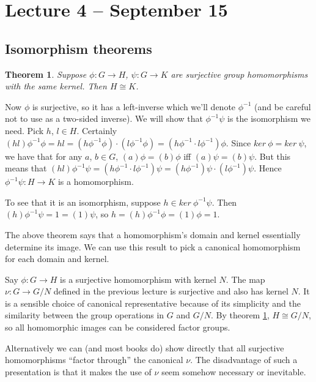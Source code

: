 \documentclass[letterpaper]{article}
\newtheorem{theorem}{Theorem}[section]
\newcommand{\mdot}{{\cdot}}
\newenvironment{proof}[1][Proof]{\begin{trivlist}
\item[\hskip \labelsep {\bfseries #1}]}{\end{trivlist}}
\begin{document}
\section{Lecture 4 -- September 15}

\subsection{Isomorphism theorems}

\begin{theorem}
\label{firstiso}
Suppose $\phi \colon G \rightarrow H$, $\psi \colon G \rightarrow K$ are surjective group homomorphisms with the same kernel. Then $H \cong K$.
\end{theorem}
\begin{proof}
Now $\phi$ is surjective, so it has a left-inverse which we'll denote $\phi^{-1}$ (and be careful not to use as a two-sided inverse). We will show that $\phi^{-1}\psi$ is the isomorphism we need. Pick $h$, $l \in H$. Certainly $(hl)\phi^{-1}\phi = hl = (h\phi^{-1} \phi)\mdot(l\phi^{-1}\phi) = (h\phi^{-1}\mdot l\phi^{-1})\phi$. Since $ker\ \phi = ker\ \psi$, we have that for any $a$, $b \in G$, $(a)\phi = (b)\phi$ iff $(a)\psi = (b)\psi$. But this means that $(hl)\phi^{-1}\psi = (h\phi^{-1}\mdot l\phi^{-1})\psi = (h\phi^{-1})\psi\mdot (l\phi^{-1})\psi$. Hence $\phi^{-1}\psi \colon H \rightarrow K$ is a homomorphism.

To see that it is an isomorphism, suppose $h \in ker\ \phi^{-1}\psi$. Then $(h)\phi^{-1}\psi = 1 = (1)\psi$, so $h = (h)\phi^{-1}\phi = (1)\phi = 1$.
\end{proof}

The above theorem says that a homomorphism's domain and kernel essentially determine its image. We can use this result to pick a canonical homomorphism for each domain and kernel.

Say $\phi \colon G \rightarrow H$ is a surjective homomorphism with kernel $N$. The map $\nu \colon G \rightarrow G/N$ defined in the previous lecture is surjective and also has kernel $N$. It is a sensible choice of canonical representative because of its simplicity and the similarity between the group operations in $G$ and $G/N$. By theorem \ref{firstiso}, $H \cong G/N$, so all homomorphic images can be considered factor groups.

Alternatively we can (and most books do) show directly that all surjective homomorphisms ``factor through'' the canonical $\nu$. The disadvantage of such a presentation is that it makes the use of $\nu$ seem somehow necessary or inevitable.
\end{document}
